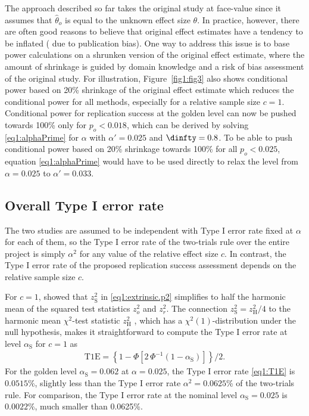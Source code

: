 The approach described so far takes the original study at face-value since it
assumes that $\hat \theta_o$ is equal to the unknown effect size $\theta$. In
practice, however, there are often good reasons to believe that original effect
estimates have a tendency to be inflated (\eg{} due to publication bias). One way
to address this issue is to base power calculations on a shrunken version of the
original effect estimate, where the amount of shrinkage is guided by domain
knowledge and a risk of bias assessment of the original study. For illustration,
Figure~\ref{fig1:fig3} also shows conditional power based on 20\% shrinkage of
the original effect estimate which reduces the conditional power for all
methods, especially for a relative sample size $c = 1$. Conditional power for
replication success at the golden level can now be pushed towards 100\% only for
$p_o < 0.018$, which can be derived by solving \eqref{eq1:alphaPrime} for
$\alpha$ with $\alpha'=0.025$ and $\dinfty=0.8$. To be able to push conditional
power based on 20\% shrinkage towards 100\% for all $p_o < 0.025$, equation
\eqref{eq1:alphaPrime} would have to be used directly to relax the level from
$\alpha=0.025$ to $\alpha'=0.033$.


\subsection{Overall Type I error rate}\label{sec1:T1E}
The two studies are assumed to be independent with Type I error rate fixed at
$\alpha$ for each of them, so the Type I error rate of the two-trials rule over
the entire project is simply $\alpha^2$ for any value of the relative effect
size $c$. In contrast, the Type I error rate of the proposed replication success
assessment {depends on} the relative sample size $c$.

For $c=1$, \citet[Section 3]{Held2020} showed that $z_{\mathrm{S}}^2$ in
\eqref{eq1:extrinsic.p2} simplifies to half the harmonic mean of the squared
test statistics $z_o^2$ and $z_r^2$. The connection
$z_{\mathrm{S}}^2 = z_{\mathrm{H}}^2/4$ to the harmonic mean $\chi^2$-test
statistic $z_{\mathrm{H}}^2$ \citep{Held2020b}, which has a
$\chi^2(1)$-distribution under the null hypothesis, makes it straightforward to
compute the Type I error rate at level $\alpha_{\mathrm{S}}$ for $c = 1$ as
\begin{eqnarray}\label{eq1:T1E}
\mbox{T1E} =   \left\{1-\Phi\left[2 \, \Phi^{-1}\left(1-\alpha_{\mathrm{S}} \right)
 \right]\right\}/2.
\end{eqnarray}
For the golden level $\alpha_{\mathrm{S}} =0.062$ at $\alpha = 0.025$, the Type I error
rate \eqref{eq1:T1E} is $0.0515$\%, slightly less than the Type I error rate
$\alpha^2=0.0625$\% of the two-trials rule. For comparison, the Type I error
rate at the nominal level $\alpha_{\mathrm{S}}=0.025$ is $0.0022$\%, much smaller than
0.0625\%.


